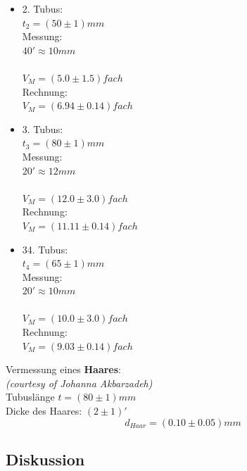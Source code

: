 \documentclass[12pt,a4paper]{article}
\begin{document}
\begin{multicols}{2}
\begin{itemize}
	\item 2. Tubus:\\
	$t_2=(50 \pm 1) mm$\\
	Messung:\\
	$40' \approx 10mm$\\
	\\
	$V_M= (5.0 \pm 1.5)fach$\\
	Rechnung: \\
	$V_M=(6.94 \pm 0.14)fach$
	
	\item 3. Tubus:\\
	$t_3=(80 \pm 1) mm$\\
	Messung:\\
	$20' \approx 12mm$\\
	\\
	$V_M= (12.0 \pm 3.0)fach$\\
	Rechnung: \\
	$V_M=(11.11 \pm 0.14)fach$
	
	\item 34. Tubus:\\
	$t_4=(65 \pm 1) mm$\\
	Messung:\\
	$20' \approx 10mm$\\
	\\
	$V_M= (10.0 \pm 3.0)fach$\\
	Rechnung: \\
	$V_M=(9.03 \pm 0.14)fach$
	
	
\end{itemize}

\noindent Vermessung eines \textbf{Haares}:\\
\textit{(courtesy of Johanna Akbarzadeh)}\\
Tubuslänge $t= (80 \pm 1)mm$\\
Dicke des Haares: $(2 \pm 1)'$\\
$$d_{Haar} = (0.10 \pm 0.05)mm$$



\subsection{Diskussion}


\end{multicols}
\end{document}
